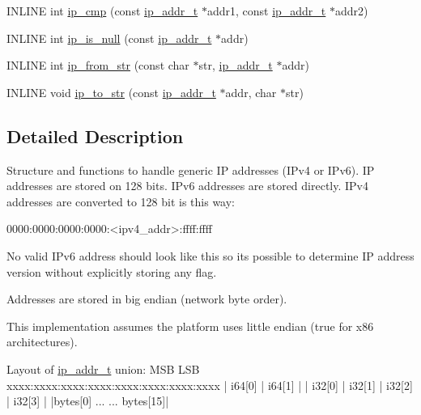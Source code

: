 \begin{DoxyCompactItemize}
\item 
I\+N\+L\+I\+NE int \hyperlink{group__ur__ipaddr_ga6b852d36a8e8b8932058fba40570a24a}{ip\+\_\+cmp} (const \hyperlink{group__ur__ipaddr_ga25f353236a342b23c6eb35f4a87176b5}{ip\+\_\+addr\+\_\+t} $\ast$addr1, const \hyperlink{group__ur__ipaddr_ga25f353236a342b23c6eb35f4a87176b5}{ip\+\_\+addr\+\_\+t} $\ast$addr2)
\item 
I\+N\+L\+I\+NE int \hyperlink{group__ur__ipaddr_ga43a7b7ceb95df7a142c5da17fa778cd0}{ip\+\_\+is\+\_\+null} (const \hyperlink{group__ur__ipaddr_ga25f353236a342b23c6eb35f4a87176b5}{ip\+\_\+addr\+\_\+t} $\ast$addr)
\item 
I\+N\+L\+I\+NE int \hyperlink{group__ur__ipaddr_gae01409ca18c16d2b28292ff94802b51b}{ip\+\_\+from\+\_\+str} (const char $\ast$str, \hyperlink{group__ur__ipaddr_ga25f353236a342b23c6eb35f4a87176b5}{ip\+\_\+addr\+\_\+t} $\ast$addr)
\item 
I\+N\+L\+I\+NE void \hyperlink{group__ur__ipaddr_ga4aa063dc904a602c2ee1f46bf50315e7}{ip\+\_\+to\+\_\+str} (const \hyperlink{group__ur__ipaddr_ga25f353236a342b23c6eb35f4a87176b5}{ip\+\_\+addr\+\_\+t} $\ast$addr, char $\ast$str)
\end{DoxyCompactItemize}


\subsection{Detailed Description}
Structure and functions to handle generic IP addresses (I\+Pv4 or I\+Pv6). IP addresses are stored on 128 bits. I\+Pv6 addresses are stored directly. I\+Pv4 addresses are converted to 128 bit is this way\+: 
\begin{DoxyCode}
0000:0000:0000:0000:<ipv4\_addr>:ffff:ffff
\end{DoxyCode}
 No valid I\+Pv6 address should look like this so it\textquotesingle{}s possible to determine IP address version without explicitly storing any flag.

Addresses are stored in big endian (network byte order).

This implementation assumes the platform uses little endian (true for x86 architectures).


\begin{DoxyCode}
Layout of \hyperlink{unionip__addr__u}{ip\_addr\_t} \textcolor{keyword}{union}:
 MSB                                 LSB
 xxxx:xxxx:xxxx:xxxx:xxxx:xxxx:xxxx:xxxx
|      i64[0]       |       i64[1]      |
| i32[0]  | i32[1]  | i32[2]  | i32[3]  |
|bytes[0] ...              ... bytes[15]|
\end{DoxyCode}
 

